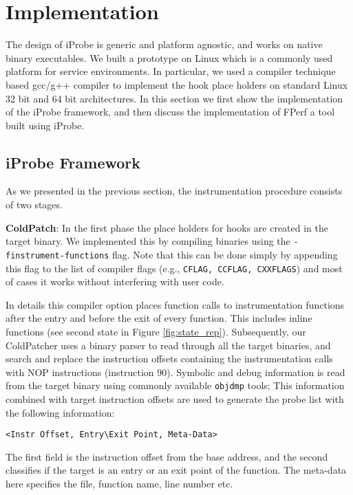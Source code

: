 \section{Implementation}
\label{sec:Implementation}

The design of iProbe is generic and platform agnostic, and works on native binary executables. 
We built a prototype on Linux which is a commonly used platform for service environments. 
In particular, we used a compiler technique based gcc/g++ compiler to implement the hook place holders on standard Linux 32 bit and 64 bit architectures. 
In this section we first show the implementation of the iProbe framework, and then discuss the implementation of FPerf a tool built using iProbe.

\subsection{iProbe Framework}
As we presented in the previous section, the instrumentation procedure consists of two stages.

\indent \textbf{ColdPatch}: In the first phase the place holders for hooks are created in the target binary. 
We implemented this by compiling binaries using the \texttt{-finstrument-functions} flag. 
Note that this can be done simply by appending this flag to the list of compiler flags (e.g., \texttt{CFLAG, CCFLAG, CXXFLAGS}) and most of cases it works without interfering with user code. 

In details this compiler option places function calls to instrumentation functions after the entry and before the exit of every function.
This includes inline functions (see second state in Figure \ref{fig:state_rep}). 
Subsequently, our ColdPatcher uses a binary parser to read through all the target binaries, and search and replace the instruction offsets containing the instrumentation calls with NOP instructions (instruction 90). 
Symbolic and debug information is read from the target binary using commonly available \texttt{objdmp} tools; 
This information combined with target instruction offsets are used to generate the probe list with the following information:
\begin{verbatim}
<Instr Offset, Entry\Exit Point, Meta-Data>
\end{verbatim}
The first field is the instruction offset from the base address, and the second classifies if the target is an entry or an exit point of the function. 
The meta-data here specifies the file, function name, line number etc. 

